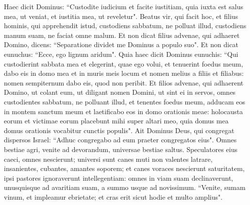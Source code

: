 \begin{biblechapter}  
\verse Haec dicit Dominus: “Custodite iudicium et facite iustitiam, quia iuxta est salus mea, ut veniat, et iustitia mea, ut reveletur". 
\verse Beatus vir, qui facit hoc, et filius hominis, qui apprehendit istud, custodiens sabbatum, ne polluat illud, custodiens manum suam, ne faciat omne malum. 
\verse Et non dicat filius advenae, qui adhaeret Domino, dicens: “Separatione dividet me Dominus a populo suo". Et non dicat eunuchus: “Ecce, ego lignum aridum". 
\verse Quia haec dicit Dominus eunuchis: “Qui custodierint sabbata mea et elegerint, quae ego volui, et tenuerint foedus meum, 
\verse dabo eis in domo mea et in muris meis locum et nomen melius a filiis et filiabus: nomen sempiternum dabo eis, quod non peribit. 
\verse Et filios advenae, qui adhaerent Domino, ut colant eum, ut diligant nomen Domini, ut sint ei in servos, omnes custodientes sabbatum, ne polluant illud, et tenentes foedus meum, 
\verse adducam eos in montem sanctum meum et laetificabo eos in domo orationis meae: holocausta eorum et victimae eorum placebunt mihi super altari meo, quia domus mea domus orationis vocabitur cunctis populis". 
\verse Ait Dominus Deus, qui congregat dispersos Israel: “Adhuc congregabo ad eum praeter congregatos eius". 
\verse Omnes bestiae agri, venite ad devorandum, universae bestiae saltus. 
\verse Speculatores eius caeci, omnes nescierunt; universi sunt canes muti non valentes latrare, insanientes, cubantes, amantes soporem; 
\verse et canes voraces nescierunt saturitatem, ipsi pastores ignoraverunt intellegentiam: omnes in viam suam declinaverunt, unusquisque ad avaritiam suam, a summo usque ad novissimum. 
\verse “Venite, sumam vinum, et impleamur ebrietate; et cras erit sicut hodie et multo amplius". 
\end{biblechapter}

